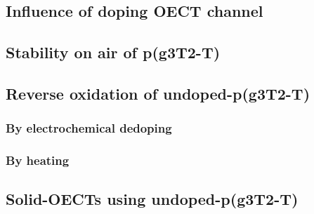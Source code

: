 


\subsection{Influence of doping OECT channel}

\subsection{Stability on air of p(g3T2-T)}

\subsection{Reverse oxidation of undoped-p(g3T2-T)}

\subsubsection{By electrochemical dedoping}

\subsubsection{By heating}


\subsection{Solid-OECTs using undoped-p(g3T2-T)}

